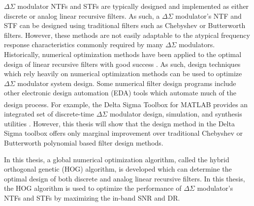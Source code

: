  $\Delta\Sigma$ modulator NTFs and STFs are typically designed and implemented  as either
discrete or analog linear recursive filters. As such, a $\Delta\Sigma$ modulator's NTF and
STF can be designed using traditional filters such as Chebyshev or Butterworth filters.
However, these methods are not easily adaptable to the atypical frequency response
characteristics commonly required by many $\Delta\Sigma$ modulators. Historically,
numerical optimization methods have been applied to the optimal design of linear recursive
filters with good success
\cite{rabiner_linear_1974}\cite{chen_design_1990}\cite{cortelazzo_simultaneous_1984}. As
such, design techniques which rely heavily on numerical optimization methods can be used
to optimize $\Delta\Sigma$ modulator system design. Some numerical filter design
programs include other electronic design automation (EDA) tools which automate much of the
design process. For example, the Delta Sigma Toolbox for
MATLAB\textsuperscript{\textregistered} provides an integrated set of discrete-time
$\Delta\Sigma$ modulator design, simulation, and synthesis utilities
\cite{schreier_understanding_2004}. However, this thesis will show that the design method
in the Delta Sigma toolbox offers only marginal improvement over traditional Chebyshev or
Butterworth polynomial based filter design methods.

In this thesis, a global numerical optimization algorithm, called the hybrid orthogonal
genetic (HOG) algorithm, is developed which can determine the optimal design of both
discrete and analog linear recursive filters. In this thesis, the HOG algorithm is used to
optimize the performance of $\Delta\Sigma$ modulator's NTFs and STFs by maximizing
the in-band SNR and DR.

